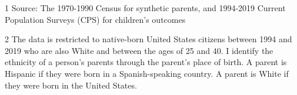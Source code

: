 \begin{table}[H]
{\begin{threeparttable}
\begin{tabular}[t]{lcccccc}
\bottomrule
\end{tabular}
\begin{tablenotes}
\item[1] Source: The 1970-1990 Census for synthetic parents, and 1994-2019 Current Population Surveys (CPS) for children's outcomes
\item[2] The data is restricted to native-born United States citizens between 1994 and 2019 who are also White and between the ages of 25 and 40. I identify the ethnicity of a person's parents through the parent's place of birth. A parent is Hispanic if they were born in a Spanish-speaking country. A parent is White if they were born in the United States.
\end{tablenotes}
\end{threeparttable}}
\end{table}
